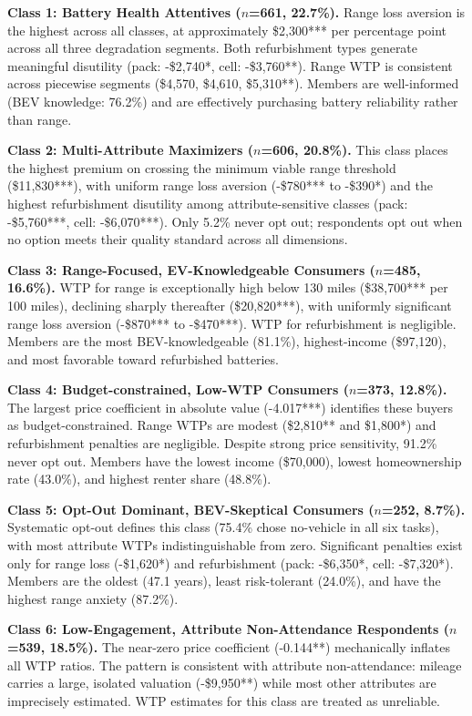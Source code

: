 \documentclass[12pt,a4paper]{extarticle}
\begin{document}
\textbf{Class 1: Battery Health Attentives ($n$=661, 22.7\%).} Range loss aversion is the highest across all classes, at approximately \$2,300*** per percentage point across all three degradation segments. Both refurbishment types generate meaningful disutility (pack: -\$2,740*, cell: -\$3,760**). Range WTP is consistent across piecewise segments (\$4,570, \$4,610, \$5,310**). Members are well-informed (BEV knowledge: 76.2\%) and are effectively purchasing battery reliability rather than range.

\textbf{Class 2: Multi-Attribute Maximizers ($n$=606, 20.8\%).} This class places the highest premium on crossing the minimum viable range threshold (\$11,830***), with uniform range loss aversion (-\$780*** to -\$390*) and the highest refurbishment disutility among attribute-sensitive classes (pack: -\$5,760***, cell: -\$6,070***). Only 5.2\% never opt out; respondents opt out when no option meets their quality standard across all dimensions.

\textbf{Class 3: Range-Focused, EV-Knowledgeable Consumers ($n$=485, 16.6\%).} WTP for range is exceptionally high below 130 miles (\$38,700*** per 100 miles), declining sharply thereafter (\$20,820***), with uniformly significant range loss aversion (-\$870*** to -\$470***). WTP for refurbishment is negligible. Members are the most BEV-knowledgeable (81.1\%), highest-income (\$97,120), and most favorable toward refurbished batteries.

\textbf{Class 4: Budget-constrained, Low-WTP Consumers ($n$=373, 12.8\%).} The largest price coefficient in absolute value (-4.017***) identifies these buyers as budget-constrained. Range WTPs are modest (\$2,810** and \$1,800*) and refurbishment penalties are negligible. Despite strong price sensitivity, 91.2\% never opt out. Members have the lowest income (\$70,000), lowest homeownership rate (43.0\%), and highest renter share (48.8\%).

\textbf{Class 5: Opt-Out Dominant, BEV-Skeptical Consumers ($n$=252, 8.7\%).} Systematic opt-out defines this class (75.4\% chose no-vehicle in all six tasks), with most attribute WTPs indistinguishable from zero. Significant penalties exist only for range loss (-\$1,620*) and refurbishment (pack: -\$6,350*, cell: -\$7,320*). Members are the oldest (47.1 years), least risk-tolerant (24.0\%), and have the highest range anxiety (87.2\%).

\textbf{Class 6: Low-Engagement, Attribute Non-Attendance Respondents ($n$=539, 18.5\%).} The near-zero price coefficient (-0.144**) mechanically inflates all WTP ratios. The pattern is consistent with attribute non-attendance: mileage carries a large, isolated valuation (-\$9,950**) while most other attributes are imprecisely estimated. WTP estimates for this class are treated as unreliable.
\end{document}
